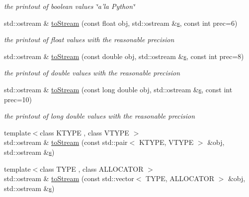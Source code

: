\begin{DoxyCompactItemize}
\begin{DoxyCompactList}\small\item\em the printout of boolean values \char`\"{}a'la Python\char`\"{} \item\end{DoxyCompactList}\item 
std::ostream \& \hyperlink{namespace_d_d4hep_1_1_utils_af0a209fec5d19539ace63d69570c70b7}{toStream} (const float obj, std::ostream \&\hyperlink{_volumes_8cpp_a17ca6bfc8040d695d3cada22a4763d40}{s}, const int prec=6)
\begin{DoxyCompactList}\small\item\em the printout of float values with the reasonable precision \item\end{DoxyCompactList}\item 
std::ostream \& \hyperlink{namespace_d_d4hep_1_1_utils_a63ebaf591a7f6deb9f4f5d9984e3b745}{toStream} (const double obj, std::ostream \&\hyperlink{_volumes_8cpp_a17ca6bfc8040d695d3cada22a4763d40}{s}, const int prec=8)
\begin{DoxyCompactList}\small\item\em the printout of double values with the reasonable precision \item\end{DoxyCompactList}\item 
std::ostream \& \hyperlink{namespace_d_d4hep_1_1_utils_ac4881c1c93e7105a9f241b2664679409}{toStream} (const long double obj, std::ostream \&\hyperlink{_volumes_8cpp_a17ca6bfc8040d695d3cada22a4763d40}{s}, const int prec=10)
\begin{DoxyCompactList}\small\item\em the printout of long double values with the reasonable precision \item\end{DoxyCompactList}\item 
{\footnotesize template$<$class KTYPE , class VTYPE $>$ }\\std::ostream \& \hyperlink{namespace_d_d4hep_1_1_utils_aa662bd0ad73f64bb42253a7b5023c8a6}{toStream} (const std::pair$<$ KTYPE, VTYPE $>$ \&obj, std::ostream \&\hyperlink{_volumes_8cpp_a17ca6bfc8040d695d3cada22a4763d40}{s})
\item 
{\footnotesize template$<$class TYPE , class ALLOCATOR $>$ }\\std::ostream \& \hyperlink{namespace_d_d4hep_1_1_utils_a630d3fee3bf5700b7a13b93ae0749a51}{toStream} (const std::vector$<$ TYPE, ALLOCATOR $>$ \&obj, std::ostream \&\hyperlink{_volumes_8cpp_a17ca6bfc8040d695d3cada22a4763d40}{s})

\end{DoxyCompactItemize}
